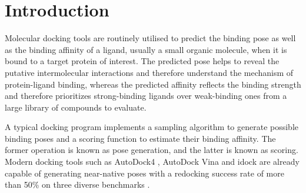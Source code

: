 \documentclass[twocolumn]{bmcart}
\begin{document}


\section*{Introduction}

Molecular docking tools are routinely utilised to predict the binding pose as well as the binding affinity of a ligand, usually a small organic molecule, when it is bound to a target protein of interest. The predicted pose helps to reveal the putative intermolecular interactions and therefore understand the mechanism of protein-ligand binding, whereas the predicted affinity reflects the binding strength and therefore prioritizes strong-binding ligands over weak-binding ones from a large library of compounds to evaluate.

A typical docking program implements a sampling algorithm to generate possible binding poses and a scoring function to estimate their binding affinity. The former operation is known as pose generation, and the latter is known as scoring. Modern docking tools such as AutoDock4 \cite{596}, AutoDock Vina \cite{595} and idock \cite{1362} are already capable of generating near-native poses with a redocking success rate of more than 50\% on three diverse benchmarks \cite{1362}.
\end{document}
